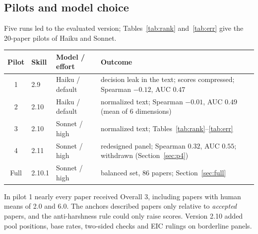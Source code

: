 \documentclass[11pt,a4paper]{article}
\begin{document}
\subsection{Pilots and model choice}\label{sec:pilots}
Five runs led to the evaluated version; Tables~\ref{tab:rank} and~\ref{tab:err} give the
20-paper pilots of Haiku and Sonnet.
\begin{center}\small
\begin{tabularx}{\linewidth}{cllX}
\toprule
Pilot & Skill & Model / effort & Outcome\\
\midrule
1 & 2.9  & Haiku / default & decision leak in the text; scores compressed; Spearman $-0.12$, AUC $0.47$\\
2 & 2.10 & Haiku / default & normalized text; Spearman $-0.01$, AUC $0.49$ (mean of 6 dimensions)\\
3 & 2.10 & Sonnet / high   & normalized text; Tables~\ref{tab:rank}--\ref{tab:err}\\
4 & 2.11 & Sonnet / high   & redesigned panel; Spearman $0.32$, AUC $0.55$; withdrawn (Section~\ref{sec:p4})\\
Full & 2.10.1 & Sonnet / high & balanced set, 86 papers; Section~\ref{sec:full}\\
\bottomrule
\end{tabularx}
\end{center}

In pilot 1 nearly every paper received Overall 3, including papers with human means of 2.0 and
6.0. The anchors described papers only relative to \emph{accepted} papers, and the anti-harshness
rule could only raise scores. Version 2.10 added pool positions, base rates, two-sided checks and
EIC rulings on borderline panels.
\end{document}
